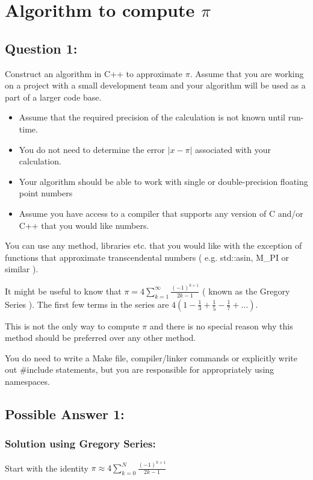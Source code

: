 \documentclass[letterpaper,11pt]{article}
\begin{document}
\section*{Algorithm to compute  $\pi$}

\subsection*{Question 1:}

Construct an algorithm in C++ to approximate $\pi$. Assume that you are working on a project
 with a small development team and your algorithm will be used
 as a part of a larger code base.

\begin{itemize}
  \item Assume that the required precision of the calculation is not known until run-time.
  \item You do not need to determine the error $\lvert x - \pi \rvert$ associated with
   your calculation.
  \item Your algorithm should be able to work with single or double-precision floating point numbers
  \item Assume you have access to a compiler that supports any version of C and/or C++ that you would like
  numbers.
\end{itemize}

You can use any method, libraries etc. that you would
like with the exception of functions that approximate transcendental numbers ( e.g.
 std::asin, M\_PI or similar ).

It might be useful to know that $\pi = 4 \sum_{k=1}^{\infty} \frac{ (-1)^{k+1} }{ 2k - 1 }$
( known as the Gregory Series ). The first few terms in the series are $
4( 1 - \frac{1}{3} + \frac{1}{5} - \frac{1}{7} + \dots )$.

This is not the only way to compute $\pi$ and there is no special reason why this
 method should be preferred over any other method.

You do need to write a Make file, compiler/linker commands or
explicitly write out \#include statements, but you are responsible for appropriately
  using namespaces.

\subsection*{Possible Answer 1:}

\subsubsection*{Solution using Gregory Series:}
Start with the identity $\pi \approx 4 \sum_{k=0}^{N} \frac{ (-1)^{k+1} }{ 2k - 1 }$
\end{document}
